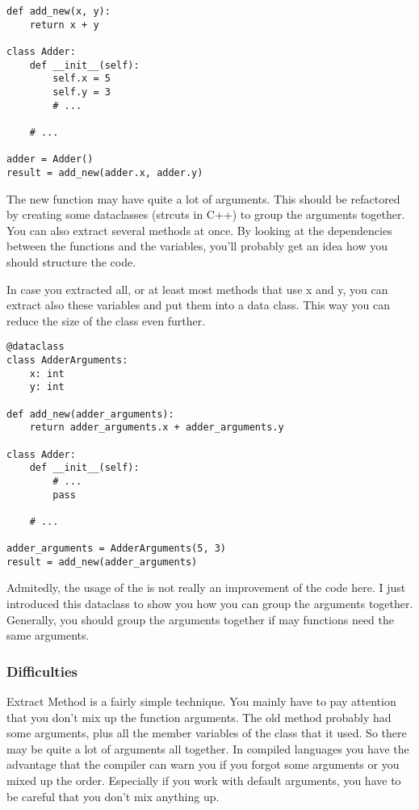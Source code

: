 \begin{programcode}{}
\begin{verbatim}
def add_new(x, y):
    return x + y

class Adder:
    def __init__(self):
        self.x = 5
        self.y = 3
        # ...
    
    # ...

adder = Adder()
result = add_new(adder.x, adder.y)
\end{verbatim}
\end{programcode}

The new function may have quite a lot of arguments. This should be refactored by creating some dataclasses (strcuts in C++) to group the arguments together. You can also extract several methods at once. By looking at the dependencies between the functions and the variables, you'll probably get an idea how you should structure the code.

In case you extracted all, or at least most methods that use x and y, you can extract also these variables and put them into a data class. This way you can reduce the size of the class even further.

\begin{programcode}{}
\begin{verbatim}
@dataclass
class AdderArguments:
    x: int
    y: int

def add_new(adder_arguments):
    return adder_arguments.x + adder_arguments.y

class Adder:
    def __init__(self):
        # ...
        pass
    
    # ...

adder_arguments = AdderArguments(5, 3)
result = add_new(adder_arguments)
\end{verbatim}
\end{programcode}

Admitedly, the usage of the  is not really an improvement of the code here. I just introduced this dataclass to show you how you can group the arguments together. Generally, you should group the arguments together if may functions need the same arguments. 

\subsubsection*{Difficulties}

Extract Method is a fairly simple technique. You mainly have to pay attention that you don't mix up the function arguments. The old method probably had some arguments, plus all the member variables of the class that it used. So there may be quite a lot of arguments all together. In compiled languages you have the advantage that the compiler can warn you if you forgot some arguments or you mixed up the order. Especially if you work with default arguments, you have to be careful that you don't mix anything up.

